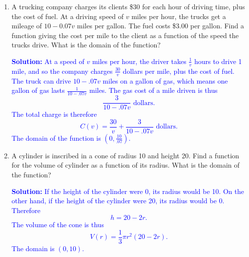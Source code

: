 \documentclass[letterpaper,11pt]{article}
\newcommand{\sol}[2]{\begin{minipage}[c][#1]{\linewidth}{\textcolor{blue}{\textbf{Solution:}}\quad \textcolor{blue}{#2}}\end{minipage}}
\newcommand{\sol}[2]{\begin{minipage}[c][#1]{\linewidth}{\vfill}\end{minipage}}
\begin{document}
\begin{enumerate}
\begin{enumerate}
\sol{1.6in}{
The derivative of $R$ is
\[R'(x) = .05(80000-250x) - 250(2.25 + .05x)=3437.5-25x.\]
The minimum of $R$ occurs when $R'=0$, which is true when 
\[x = \frac{3437.5}{25}\approx137.5.\]
So the fare ought to be \$137.50.
}
\end{enumerate}
\newpage
\item A trucking company charges its clients \$30 for each hour of driving time, plus the cost of fuel.  At a driving speed of $v$ miles per hour, the trucks get a mileage of $10-0.07v$ miles per gallon.  The fuel costs \$3.00 per gallon.  Find a function giving the cost per mile to the client as a function of the speed the trucks drive.  What is the domain of the function?

\sol{3in}{
	At a speed of $v$ miles per hour, the driver takes $\frac{1}{v}$ hours to drive 1 mile, and so the company charges $\frac{30}{v}$ dollars per mile, plus the cost of fuel.
	The truck can drive $10-.07v$ miles on a gallon of gas, which means one gallon of gas lasts $\frac{1}{10-.07v}$ miles.
	The gas cost of a mile driven is thus
	\[\frac{3}{10-.07v}\text{ dollars.}\]
	The total charge is therefore
	\[C(v)=\frac{30}{v} + \frac{3}{10-.07v}\text{ dollars}.\]
	The domain of the function is $\left(0,\frac{10}{.07}\right)$.
}

\item  A cylinder is inscribed in a cone of radius 10 and height 20.  Find a function for the volume of cylinder as a function of its radius. What is the domain of the function?

\sol{3in}{
	If the height of the cylinder were $0$, its radius would be 10.
	On the other hand, if the height of the cylinder were 20, its radius would be 0.
	Therefore
	\[h = 20 - 2r.\]
	The volume of the cone is thus
	\[V(r)=\frac{1}{3}\pi r^2 (20-2r).\]
	The domain is $(0,10)$.
}
\end{enumerate}
\end{document}
